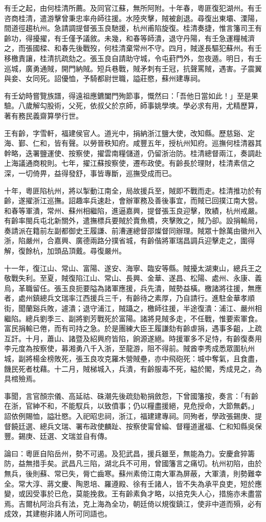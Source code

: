 \begin{pinyinscope}
有壬之起，由何桂清所薦。及同官江蘇，無所阿附。十年春，粵匪復犯湖州。有壬咨商桂清，遣游擊曾秉忠率舟師往援。水陸夾擊，賊被創退。尋復出東壩、溧陽，間道徑趨杭州。急請調提督張玉良馳援，杭州甫陷旋復。桂清奏捷，惟言籓司王有齡功，得擾擢，有壬僅予議敘。未幾，和春等師潰，退守丹陽，有壬急運糧械濟之，而張國樑、和春先後戰歿，何桂清棄常州不守。四月，賊遂長驅犯蘇州。有壬移檄責讓，桂清抗疏劾之。張玉良自請助守城，令屯葑門外，忽夜遁。明日，有壬巡城，廣勇通賊，開門納賊。短兵巷戰，賊矛刺有壬冠，抗聲罵賊，遇害。子震翼與妾、女同死。詔優恤，予騎都尉世職，謚莊愍，蘇州建專祠。

有壬幼時嘗覽族譜，得遠祖應鑣闔門殉節事，慨然曰：「吾他日當如此！」至是果驗。八歲解勾股術，父死，依叔父於京師，師事姚學塽。學必求有用，尤精歷算，著有務民義齋算學行世。

王有齡，字雪軒，福建侯官人。道光中，捐納浙江鹽大使，改知縣。歷慈谿、定海、鄞、仁和，皆有聲。以勞晉秩知府。咸豐五年，授杭州知府。巡撫何桂清器其幹略，迭署鹽運使、按察使，擢雲南糧儲道，仍留浙治防。桂清總督兩江，奏調赴上海議通商稅則。七年，擢江蘇按察使，遷布政使。有齡長於理財，桂清素信之深，一切倚畀，益得發舒，事皆專斷，巡撫受成而已。

十年，粵匪陷杭州，將以掣動江南全，局故援兵至，賊即不戰而走。桂清推功於有齡，遂擢浙江巡撫。詔趣率兵速赴，會辦軍務及善後事宜，而賊已回撲江南大營。和春等軍潰，常州、蘇州相繼陷，進逼嘉興，提督張玉良迎擊，敗績，杭州戒嚴。有齡率閩兵屯北新關外，遣撫標兵要賊於賣魚橋，夾擊敗之，賊乃卻。設捐輸局，奏請派在籍前左副都御史王履謙、前漕運總督邵燦督同辦理。賊眾十餘萬由徽州入浙，陷嚴州，合嘉興、廣德兩路分撲省城，有齡偕將軍瑞昌調兵迎擊走之，圍得解，復餘杭，加頭品頂戴。尋復嚴州。

十一年，復江山、常山、富陽、遂安、海寧、臨安等縣。賊擾太湖東山，總兵王之敬戰失利。至夏，賊復陷江山、常山、長興、金華、遂昌、松陽、處州、永康、義烏，革職留任。張玉良扼要隘為諸軍應援，兵先潰，賊勢益橫。檄諸將往援，無應者，處州鎮總兵文瑞率江西援兵三千，有齡待之素厚，乃自請行。進駐金華孝順街，聞蘭谿兵敗，遽潰；退守浦江，賊躡之，檄師往援，半途復潰：浦江、嚴州相繼陷。總兵劉季三、副將劉芳戰死於富陽。諸將見賊多走，不任戰，惟要索軍食。富民捐輸已倦，而有司持之急。於是團練大臣王履謙劾有齡虐捐，遇事多齟，上疏互訐。十月，蕭山、諸暨及紹興府皆陷，餉源遂絕。時援軍多不足恃，有齡復奏用李元度為按察使，募湘勇八千入浙，至龍游，阻不得前。賊酋李秀成悉眾圍杭州城，副將楊金榜敗死，張玉良攻克羅木營賊壘，亦中飛砲死：城中奪氣，且食盡，饑民死者枕藉。十二月，賊梯城入，兵潰，有齡服毒不死，縊於閣，秀成見之，為具棺殮焉。

事聞，言官顏宗儀、高延祜、硃潮先後疏劾勒捐斂怨，下曾國籓按，奏言：「有齡在浙，官紳不和，不能馭兵，以致僨事；仍以糧盡援絕，見危授命，大節無虧。」詔依例賜恤，謚壯愍。入祀昭忠祠，浙江，福建建專祠。同殉者，學政張錫庚、提督饒廷選、總兵文瑞、署布政使麟趾、按察使甯曾綸、督糧道暹福、仁和知縣吳保豐。錫庚、廷選、文瑞並自有傳。

論曰：粵匪自陷岳州，勢不可遏。及犯武昌，援兵雖至，無能為力。安慶倉猝籌防，益無措手矣。武昌凡三陷，湖北兵不可用，曾國籓言之痛切。杭州初陷，由於無兵，後則蘇、常已失，脣亡齒寒。蘇州素倚江南大軍為屏蔽，大軍潰，則勢難幸全。常大淳、蔣文慶、陶恩培、羅遵殿、徐有壬諸人，皆不失為承平良吏，短於應變，或因受事於已危，莫能挽救。王有齡素負才略，以掊克失人心，措施亦未盡當焉。吉爾杭阿治兵有法，克上海為全功，朝廷倚以規復鎮江，使非中道而殞，必有成效，其建樹非諸人所可同語也。


\end{pinyinscope}